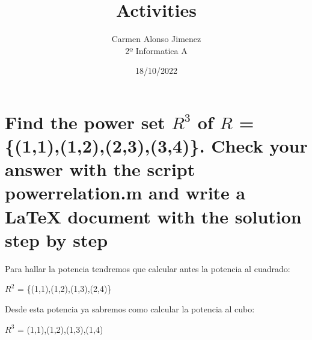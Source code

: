 \documentclass[11pt]{article}
\title{\textbf{Activities}}
\author{Carmen Alonso Jimenez\\
2º Informatica A}
\date{18/10/2022}
\begin{document}
\maketitle
\section{Find the power set $R^3$ of $R$ = \{(1,1),(1,2),(2,3),(3,4)\}. Check your answer with the script powerrelation.m and write a \LaTeX{} document with the solution step by step}


\begin {center}
Para hallar la potencia tendremos que calcular antes la potencia al cuadrado:

 
$R^2$ = \{(1,1),(1,2),(1,3),(2,4)\}


Desde esta potencia ya sabremos como calcular la potencia al cubo:

$R^3$ = {(1,1),(1,2),(1,3),(1,4)}

\end {center}
\end{document}
